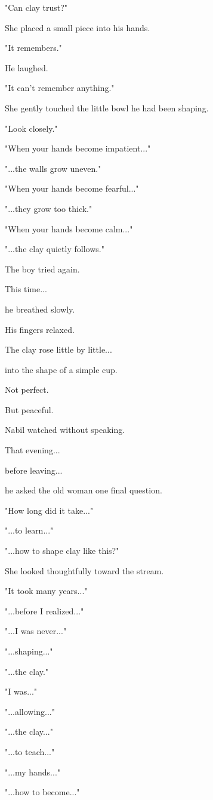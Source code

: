 \documentclass[12pt,openany]{book}
\begin{document}
"Can clay trust?"

She placed a small piece into his hands.

"It remembers."

He laughed.

"It can't remember anything."

She gently touched the little bowl he had been shaping.

"Look closely."

"When your hands become impatient..."

"...the walls grow uneven."

"When your hands become fearful..."

"...they grow too thick."

"When your hands become calm..."

"...the clay quietly follows."

The boy tried again.

This time...

he breathed slowly.

His fingers relaxed.

The clay rose little by little...

into the shape of a simple cup.

Not perfect.

But peaceful.

Nabil watched without speaking.

That evening...

before leaving...

he asked the old woman one final question.

"How long did it take..."

"...to learn..."

"...how to shape clay like this?"

She looked thoughtfully toward the stream.

"It took many years..."

"...before I realized..."

"...I was never..."

"...shaping..."

"...the clay."

"I was..."

"...allowing..."

"...the clay..."

"...to teach..."

"...my hands..."

"...how to become..."
\end{document}

